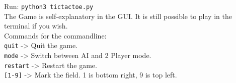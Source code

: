 \documentclass{article} %
\begin{document}
Run: \verb|python3 tictactoe.py|\\

The Game is self-explanatory in the GUI. It is still possible to play in the terminal if you wish.\\

Commands for the commandline:\\
\verb|quit| \qquad -> \qquad Quit the game.\\
\verb|mode| \qquad -> \qquad Switch between AI and 2 Player mode.\\
\verb|restart| \qquad -> \qquad Restart the game.\\

\verb|[1-9]| \qquad -> \qquad Mark the field. 1 is bottom right, 9 is top left.\\
\end{document}
